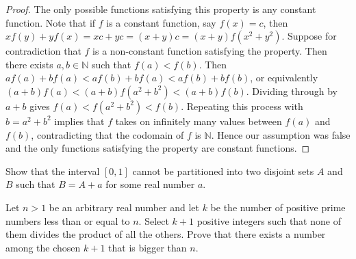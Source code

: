 \begin{proof}
    The only possible functions satisfying this property is any constant function.
    Note that if $f$ is a constant function, say $f(x) = c$, then
    $xf(y) + yf(x) = xc + yc = (x + y)c = (x+y)f(x^2 + y^2)$. Suppose for contradiction that
    $f$ is a non-constant function satisfying the property. Then there exists
    $a, b \in \mathbb{N}$ such that $f(a) < f(b)$. Then $af(a) + bf(a) < af(b) + bf(a) < af(b) + bf(b)$, 
    or equivalently $(a+b)f(a) < (a+b)f(a^2+b^2) < (a+b)f(b)$. Dividing through by $a+b$ gives
    $f(a) < f(a^2+b^2) < f(b)$. Repeating this process with $b = a^2 + b^2$ implies that $f$ takes on
    infinitely many values between $f(a)$ and $f(b)$, contradicting that the codomain of $f$ is $\mathbb{N}$.
    Hence our assumption was false and the only functions satisfying the property are constant functions.
\end{proof}

\begin{problem}
    Show that the interval $[0, 1]$ cannot be partitioned into two disjoint sets $A$ and $B$
    such that $B = A + a$ for some real number $a$.
\end{problem}

\begin{solution}
   
\end{solution}

\begin{problem}
    Let $n > 1$ be an arbitrary real number and let $k$ be the number of positive prime numbers less than or equal to
    $n$. Select $k + 1$ positive integers such that none of them divides the product of all the others. Prove that
    there exists a number among the chosen $k + 1$ that is bigger than $n$.
\end{problem}

\begin{solution}

\end{solution}
